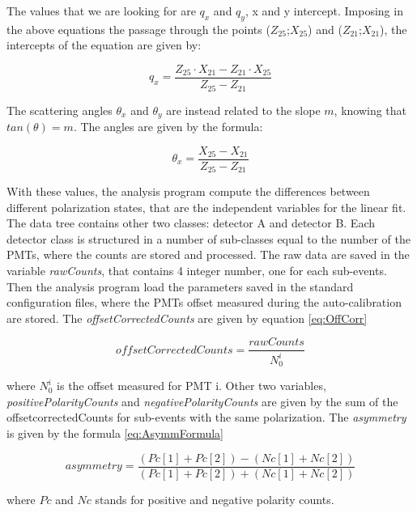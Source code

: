 \begin{appendices}
The values that we are looking for are $q_{x}$ and $q_{y}$, x and y intercept. 
Imposing in the above equations the passage through the points ($Z_{25}$;$X_{25}$) and ($Z_{21}$;$X_{21}$), the intercepts of the equation are given by:

\begin{equation}
q_{x} = \dfrac{Z_{25} \cdot X_{21} - Z_{21} \cdot X_{25}}{Z_{25} - Z_{21}}
\end{equation} 

The scattering angles $\theta_{x}$ and $\theta_{y}$ are instead related to the slope $m$, knowing that $tan(\theta) = m$. The angles are given by the formula:

\begin{equation}
\theta_{x} = \dfrac{X_{25} - X_{21}}{Z_{25} - Z_{21}}
\end{equation}

With these values, the analysis program compute the differences between different polarization states, that are the independent variables for the linear fit. 
The data tree contains other two classes: detector A and detector B. Each detector class is structured in a number of sub-classes equal to the number of the PMTs, where the counts are stored and processed. The raw data are saved in the variable \textit{rawCounts}, that contains 4 integer number, one for each sub-events. Then the analysis program load the parameters saved in the standard configuration files, where the PMTs offset measured during the auto-calibration are stored. The \textit{offsetCorrectedCounts} are given by equation \ref{eq:OffCorr}

\begin{equation} \label{eq:OffCorr}
offsetCorrectedCounts = \dfrac{rawCounts}{N_{0}^{i}}
\end{equation} 

where $N_{0}^{i}$ is the offset measured for PMT i. Other two variables, \textit{positivePolarityCounts} and \textit{negativePolarityCounts} are given by the sum of the offsetcorrectedCounts for sub-events with the same polarization. The \textit{asymmetry} is given by the formula \ref{eq:AsymmFormula}

\begin{equation} \label{eq:AsymmFormula}
asymmetry = \dfrac{(Pc[1] + Pc[2]) - (Nc[1] + Nc[2])}{(Pc[1] + Pc[2]) + (Nc[1] + Nc[2])}
\end{equation}

where $Pc$ and $Nc$ stands for positive and negative polarity counts. 
\end{appendices}